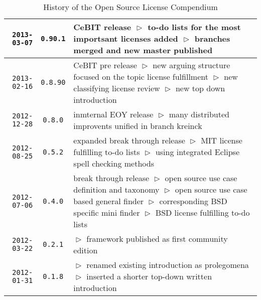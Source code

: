 \begin{table}
\footnotesize
\caption{History of the Open Source License Compendium}
\begin{center}
\begin{tabular}{|r|c|p{10cm}|}
\hline
\hline
    \texttt{2013-03-07}
  & \texttt{0.90.1} 
  & CeBIT release\newline
    $\vartriangleright$ to-do lists for the most importsant licenses added\newline
    $\vartriangleright$ branches merged and new master published\\
\hline
    \texttt{2013-02-16}
  & \texttt{0.8.90} 
  & CeBIT pre release\newline
    $\vartriangleright$ new arguing structure focused on the topic license fulfillment\newline
    $\vartriangleright$ new classifying license review\newline   
    $\vartriangleright$ new top down introduction\\
\hline
    \texttt{2012-12-28}
  & \texttt{0.8.0} 
  & inmternal EOY release\newline
    $\vartriangleright$ many distributed improvents unified in branch kreinck\\
\hline
    \texttt{2012-08-25}
  & \texttt{0.5.2} 
  & expanded break through release\newline
    $\vartriangleright$ MIT license fulfilling to-do lists\newline
    $\vartriangleright$ using integrated Eclipse spell checking methods\\
\hline
    \texttt{2012-07-06}
  & \texttt{0.4.0} 
  & break through release\newline
    $\vartriangleright$ open source use case definition and taxonomy\newline 
    $\vartriangleright$ open source use case based general finder\newline 
    $\vartriangleright$ corresponding BSD specific mini finder\newline 
    $\vartriangleright$ BSD license fulfilling to-do lists\\
\hline
    \texttt{2012-03-22}
  & \texttt{0.2.1} 
  & $\vartriangleright$ framework published as first community edition\\
\hline
    \texttt{2012-01-31}
  & \texttt{0.1.8} 
  & $\vartriangleright$ renamed existing introduction as prolegomena\newline
    $\vartriangleright$ inserted a shorter top-down written introduction\newline

\end{tabular}
\end{center}
\end{table}
